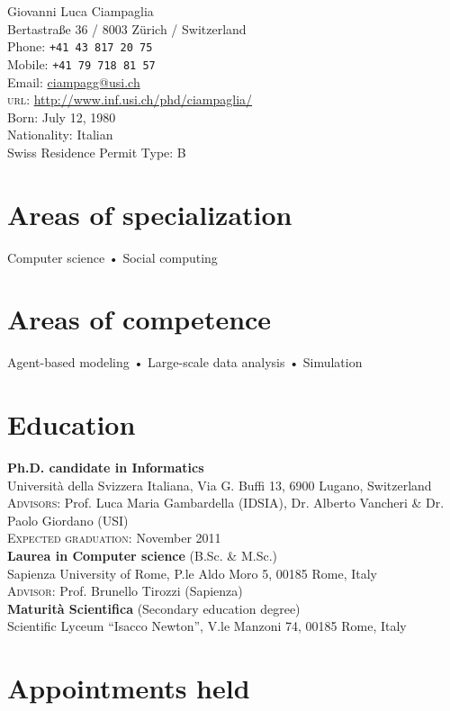 \documentclass[10pt, a4paper]{article}
\newcommand{\years}[1]{\marginnote{\scriptsize #1}}
\begin{document}
{\LARGE Giovanni Luca Ciampaglia}\\[1cm]
Bertastraße 36 / 8003 Zürich / Switzerland\\[.2cm]
Phone: \texttt{+41 43 817 20 75}\\
Mobile: \texttt{+41 79 718 81 57}\\
Email: \href{mailto:ciampagg@usi.ch}{ciampagg@usi.ch}\\
\textsc{url}: \href{http://www.inf.usi.ch/phd/ciampaglia/}{http://www.inf.usi.ch/phd/ciampaglia/}\\[.2cm]
Born:  July 12, 1980\\
Nationality: Italian\\
Swiss Residence Permit Type: B

\section*{Areas of specialization}
Computer science • Social computing

\section*{Areas of competence}
Agent-based modeling • Large-scale data analysis • Simulation

\section*{Education}
\noindent
\years{2006-2011}\textbf{Ph.D. candidate in Informatics}\\
Università della Svizzera Italiana, Via G. Buffi 13, 6900 Lugano, Switzerland\\
\textsc{Advisors}: Prof. Luca Maria Gambardella (IDSIA), Dr. Alberto Vancheri \& Dr. Paolo Giordano (USI)\\
\textsc{Expected graduation}: November 2011\\[.2cm]
\years{2000-2006}\textbf{Laurea in Computer science} (B.Sc. \& M.Sc.)\\
Sapienza University of Rome, P.le Aldo Moro 5, 00185 Rome, Italy\\
\textsc{Advisor}: Prof. Brunello Tirozzi (Sapienza)\\[.2cm]
\years{2000}\textbf{Maturità Scientifica} (Secondary education degree)\\
Scientific Lyceum ``Isacco Newton'', V.le Manzoni 74, 00185 Rome, Italy\\[.2cm]

\section*{Appointments held}
\end{document}

